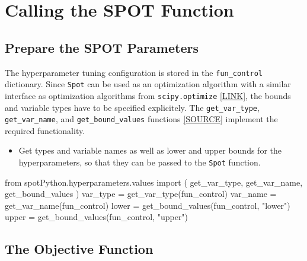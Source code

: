 \documentclass[
  letterpaper,
  DIV=11,
  numbers=noendperiod]{scrreprt}
\newenvironment{Shaded}{\begin{snugshade}}{\end{snugshade}}
\newcommand{\ImportTok}[1]{\textcolor[rgb]{0.00,0.46,0.62}{#1}}
\newcommand{\NormalTok}[1]{\textcolor[rgb]{0.00,0.23,0.31}{#1}}
\newcommand{\OperatorTok}[1]{\textcolor[rgb]{0.37,0.37,0.37}{#1}}
\newcommand{\StringTok}[1]{\textcolor[rgb]{0.13,0.47,0.30}{#1}}
\providecommand{\tightlist}{%
  \setlength{\itemsep}{0pt}\setlength{\parskip}{0pt}}\usepackage{longtable,booktabs,array}
\begin{document}
\hypertarget{calling-the-spot-function-1}{%
\section{Calling the SPOT Function}\label{calling-the-spot-function-1}}

\hypertarget{prepare-the-spot-parameters-1}{%
\subsection{Prepare the SPOT
Parameters}\label{prepare-the-spot-parameters-1}}

The hyperparameter tuning configuration is stored in the
\texttt{fun\_control} dictionary. Since \texttt{Spot} can be used as an
optimization algorithm with a similar interface as optimization
algorithms from \texttt{scipy.optimize}
\href{https://docs.scipy.org/doc/scipy/reference/optimize.html\#module-scipy.optimize}{{[}LINK{]}},
the bounds and variable types have to be specified explicitely. The
\texttt{get\_var\_type}, \texttt{get\_var\_name}, and
\texttt{get\_bound\_values} functions
\href{https://github.com/sequential-parameter-optimization/spotPython/blob/main/src/spotPython/hyperparameters/values.py}{{[}SOURCE{]}}
implement the required functionality.

\begin{itemize}
\tightlist
\item
  Get types and variable names as well as lower and upper bounds for the
  hyperparameters, so that they can be passed to the \texttt{Spot}
  function.
\end{itemize}

\begin{Shaded}
\begin{Highlighting}[]
\ImportTok{from}\NormalTok{ spotPython.hyperparameters.values }\ImportTok{import}\NormalTok{ (}
\NormalTok{    get\_var\_type,}
\NormalTok{    get\_var\_name,}
\NormalTok{    get\_bound\_values}
\NormalTok{    )}
\NormalTok{var\_type }\OperatorTok{=}\NormalTok{ get\_var\_type(fun\_control)}
\NormalTok{var\_name }\OperatorTok{=}\NormalTok{ get\_var\_name(fun\_control)}
\NormalTok{lower }\OperatorTok{=}\NormalTok{ get\_bound\_values(fun\_control, }\StringTok{"lower"}\NormalTok{)}
\NormalTok{upper }\OperatorTok{=}\NormalTok{ get\_bound\_values(fun\_control, }\StringTok{"upper"}\NormalTok{)}
\end{Highlighting}
\end{Shaded}

\hypertarget{sec-the-objective-function-51}{%
\subsection{The Objective
Function}\label{sec-the-objective-function-51}}
\end{document}

